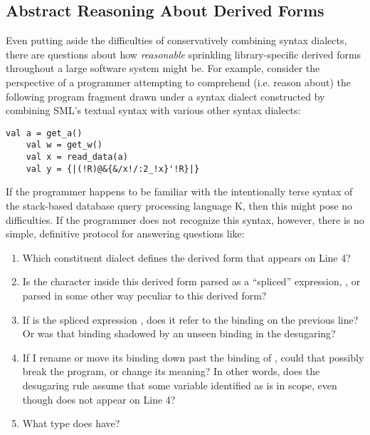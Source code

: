 \subsection{Abstract Reasoning About Derived Forms}\label{sec:abs-reasoning-intro}
Even putting aside the difficulties of conservatively combining syntax dialects, there are questions about how \emph{reasonable} sprinkling library-specific derived forms throughout a large software system might be. 
For example, consider the perspective of a programmer attempting to comprehend (i.e. reason about) the following program fragment drawn under a syntax dialect constructed by combining SML's textual syntax with various other syntax dialects:
\begin{lstlisting}[numbers=none]
    val a = get_a()
    val w = get_w()
    val x = read_data(a)
    val y = {|(!R)@&{&/x!/:2_!x}'!R}|}
\end{lstlisting}

If the programmer happens to be familiar with the intentionally terse syntax of the stack-based database query processing language K, then this might pose no difficulties. If the programmer does not recognize this syntax, however, there is no simple, definitive protocol for answering questions like:

\begin{enumerate}
\item Which constituent dialect defines the derived form that appears on Line 4?
\item Is the character  inside this derived form parsed as a ``spliced'' expression, , or parsed in some other way peculiar to this derived form?
\item If  is the spliced expression , does it refer to the binding on the previous line? Or was that binding shadowed by an unseen binding in the desugaring?
\item If I rename  or move its binding down past the binding of , could that possibly break the program, or change its meaning? In other words, does the desugaring rule assume that some variable identified as  is in scope, even though  does not appear on Line 4?
\item What type does  have?
\end{enumerate}



